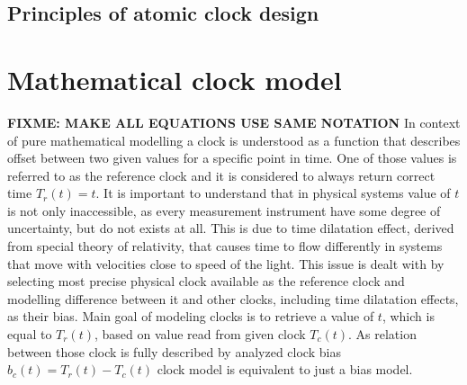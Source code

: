 \subsection{Principles of atomic clock design}


\section{Mathematical clock model}
\textbf{FIXME: MAKE ALL EQUATIONS USE SAME NOTATION}
In context of pure mathematical modelling a clock is understood as a function that describes
offset between two given values for a specific point in time. One of those values is referred 
to as the reference clock and it is considered to always return correct time $T_{r}(t)=t$.
It is important to understand that in physical systems value of $t$ is not only inaccessible, as
every measurement instrument have some degree of uncertainty, but do not exists at all.
This is due to time dilatation effect, derived from special theory of relativity, that causes
time to flow differently in systems that move with velocities close to speed of the light.
This issue is dealt with by selecting most precise physical clock available as the reference
clock and modelling difference between it and other clocks, including time dilatation effects,
as their bias.
Main goal of modeling clocks is to retrieve a value of $t$, which is equal to $T_{r}(t)$, based
on value read from given clock $T_{c}(t)$. 
As relation between those clock is fully described by analyzed clock bias 
$b_{c}(t)=T_{r}(t)-T_{c}(t)$ clock model is equivalent to just a bias model.

